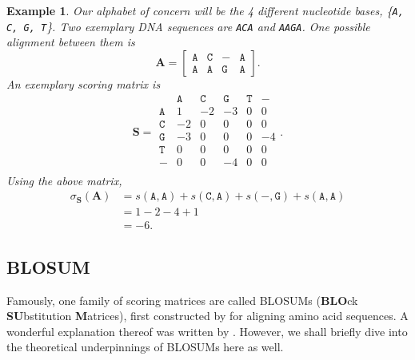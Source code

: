 \documentclass{article}
\newtheorem{example}{Example}
\begin{document}
\begin{example}
    Our alphabet of concern will be the 4
    different nucleotide bases, \{\texttt{A, C, G, T}\}. Two exemplary DNA
    sequences are \texttt{ACA} and \texttt{AAGA}. One possible alignment between them is
    \begin{equation*}
        \mathbf A = \begin{bmatrix}
            \mathtt{A} & \mathtt{C} & \mathtt{-} & \mathtt{A} \\
            \mathtt{A} & \mathtt{A} & \mathtt{G} & \mathtt{A}
        \end{bmatrix}.
    \end{equation*}
    An exemplary scoring matrix is 
    \begin{equation*}
        \mathbf S = \begin{matrix}
             & \mathtt{A} & \mathtt{C} & \mathtt{G} & \mathtt{T} &
            \mathtt{-}                                             \\ \mathtt{A} & 1          & -2         & -3         & 0
             &
            0
            \\ \mathtt{C} & -2         & 0          & 0          & 0
             & 0
            \\ \mathtt{G} & -3         & 0          & 0          & 0 & -4
            \\ \mathtt{T} & 0          & 0          & 0          & 0
             & 0
            \\ \mathtt{-} & 0          & 0          & -4         & 0
             & 0 \\
        \end{matrix}.
    \end{equation*}
    Using the above matrix, \begin{align}
	    \sigma_{\mathbf S}(\mathbf A) &= s(\mathtt A, \mathtt A) + s(\mathtt C, \mathtt A) + s(\mathtt{-}, \mathtt{G}) + s(\mathtt{A}, \mathtt{A}) \\
					  &= 1 - 2 -4 + 1 \\
					  &= -6.
    \end{align}
\end{example}

\subsection{BLOSUM}
Famously, one family of scoring matrices are called BLOSUMs (\textbf{BLO}ck \textbf{SU}bstitution \textbf{M}atrices), first constructed by \textcite{henikoffAminoAcidSubstitution1992} for aligning amino acid sequences. A wonderful explanation thereof was written by
\textcite{eddyWhereDidBLOSUM622004}. However, we shall briefly dive into the
theoretical underpinnings of BLOSUMs here as well.
\end{document}
